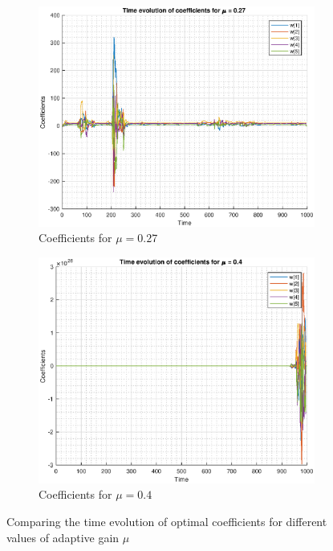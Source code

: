 \documentclass{article}
\begin{document}
\begin{figure}[h!]
\begin{subfigure}{0.32\textwidth}
\centering
\includegraphics[width = \textwidth]{time_evol_g27}
\caption{Coefficients for $\mu=0.27$}
\label{fig:time_evol_g27}
\end{subfigure}
\begin{subfigure}{0.32\textwidth}
\centering
\includegraphics[width = \textwidth]{time_evol_g4}
\caption{Coefficients for $\mu=0.4$}
\label{fig:time_evol_g4}
\end{subfigure}
\caption{Comparing the time evolution of optimal coefficients for different values of adaptive gain $\mu$}
\label{time_evol}
\end{figure}
\end{document}
